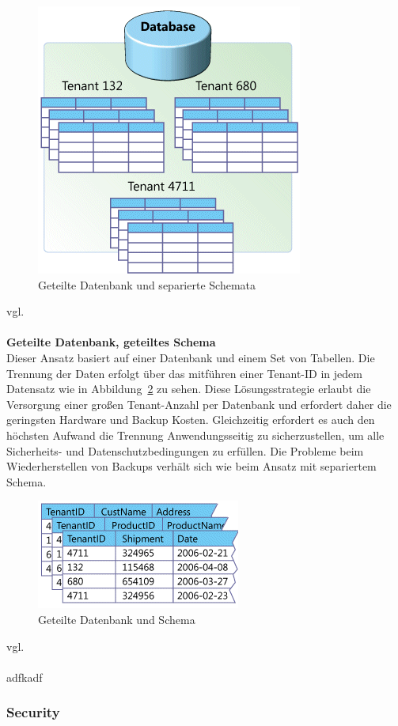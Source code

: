 	\begin{figure}[h]
		\centering
		\includegraphics[width=0.5\linewidth]{images/geteilte_datenbanken-separiertes_schema}
		\caption{Geteilte Datenbank und separierte Schemata}
		\label{fig:geteilteDatenbank}
	\end{figure}
	vgl.
\\
\\
\textbf{Geteilte Datenbank, geteiltes Schema} \\
Dieser Ansatz basiert auf einer Datenbank und einem Set von Tabellen. Die Trennung der Daten erfolgt über das mitführen einer Tenant-ID in jedem Datensatz wie in Abbildung~\ref{fig:geteilteDatenbankundSchema} zu sehen. Diese Lösungsstrategie erlaubt die Versorgung einer großen Tenant-Anzahl per Datenbank und erfordert daher die geringsten Hardware und Backup Kosten. Gleichzeitig erfordert es auch den höchsten Aufwand die Trennung Anwendungsseitig zu sicherzustellen, um alle Sicherheits- und Datenschutzbedingungen zu erfüllen. Die Probleme beim Wiederherstellen von Backups verhält sich wie beim Ansatz mit separiertem Schema. 
	\begin{figure}[h]
		\centering
		\includegraphics[width=0.5\linewidth]{images/geteilte_datenbank-geteiltes_schema}
		\caption{Geteilte Datenbank und Schema}
		\label{fig:geteilteDatenbankundSchema}
	\end{figure}
	vgl.
\\
\\
adfkadf 
\subsubsection{Security}


